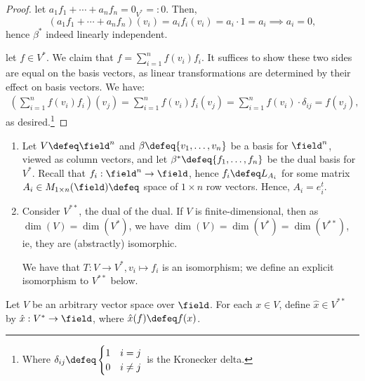 \begin{proof}
     let $a_1 f_1 + \cdots + a_n f_n = 0_{V^\ast}=: 0$. Then,
    \[
    (a_1f_1 + \cdots + a_n f_n)(v_i) = a_if_i(v_i) = a_i \cdot 1 = a_i \implies a_i = 0,    
    \]
    hence $\beta^\ast$ indeed linearly independent.

     let $f \in V^\ast$. We claim that $f = \sum_{i = 1}^n f(v_i) f_i$. It suffices to show these two sides are equal on the basis vectors, as linear transformations are determined by their effect on basis vectors. We have:
    \begin{align*}
       \left( \sum_{i=1}^n f(v_i) f_i\right)(v_j) = \sum_{i=1}^n f(v_i) f_i(v_j) = \sum_{i=1}^n f(v_i) \cdot \delta_{ij} = f(v_j),
    \end{align*}
    as desired.\footnote{Where $\delta_{ij} \defeq \begin{cases}
        1 & i = j\\
        0 & i \neq j
    \end{cases}$ is the Kronecker delta.}
\end{proof}

\begin{example}
    \begin{enumerate}
    \item Let $V \defeq \field^n$ and $\beta \defeq \{v_1, \dots, v_n\}$ be a basis for $\field^n$, viewed as column vectors, and let $\beta^\ast \defeq \{f_1, \dots, f_n\}$ be the dual basis for $V^\ast$. Recall that $f_i : \field^n \to \field$, hence $f_i \defeq L_{A_i}$ for some matrix $A_i \in M_{1 \times n}(\field) \defeq$ space of $1 \times n$ row vectors. Hence, $A_i = e_i^t$.
    \item Consider $V^{\ast \ast}$, the dual of the dual. If $V$ is finite-dimensional, then as $\dim(V)= \dim(V^\ast)$, we have $\dim(V) = \dim(V^\ast) = \dim(V^{\ast \ast})$, ie, they are (abstractly) isomorphic.
    
    We have that $T : V \to V^\ast, v_i \mapsto f_i$ is an isomorphism; we define an explicit isomorphism to $V^{\ast \ast}$ below.
\end{enumerate}
\end{example}

\begin{definition}
Let $V$ be an arbitrary vector space over $\field$. For each $x \in V$, define $\hat x\in V^{\ast \ast}$ by $\hat x : V^\ast \to \field$, where $\hat{x}(f) \defeq f(x)$.
\end{definition}

